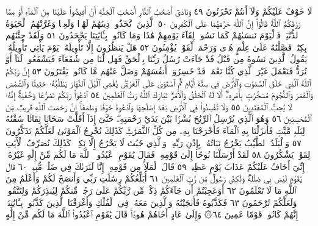 لَا خَوْفٌ عَلَيْكُمْ وَلَآ أَنتُمْ تَحْزَنُونَ ٤٩ وَنَادَىٰٓ أَصْحَٰبُ ٱلنَّارِ أَصْحَٰبَ
ٱلْجَنَّةِ أَنْ أَفِيضُوا۟ عَلَيْنَا مِنَ ٱلْمَآءِ أَوْ مِمَّا رَزَقَكُمُ ٱللَّهُۚ قَالُوٓا۟
إِنَّ ٱللَّهَ حَرَّمَهُمَا عَلَى ٱلْكَٰفِرِينَ ٥٠ ٱلَّذِينَ ٱتَّخَذُوا۟ دِينَهُمْ لَهْوࣰا
وَلَعِبࣰا وَغَرَّتْهُمُ ٱلْحَيَوٰةُ ٱلدُّنْيَاۚ فَٱلْيَوْمَ نَنسَىٰهُمْ كَمَا نَسُوا۟
لِقَآءَ يَوْمِهِمْ هَٰذَا وَمَا كَانُوا۟ بِـَٔايَٰتِنَا يَجْحَدُونَ ٥١
وَلَقَدْ جِئْنَٰهُم بِكِتَٰبࣲ فَصَّلْنَٰهُ عَلَىٰ عِلْمٍ هُدࣰى وَرَحْمَةࣰ
لِّقَوْمࣲ يُؤْمِنُونَ ٥٢ هَلْ يَنظُرُونَ إِلَّا تَأْوِيلَهُۥۚ يَوْمَ يَأْتِي تَأْوِيلُهُۥ
يَقُولُ ٱلَّذِينَ نَسُوهُ مِن قَبْلُ قَدْ جَآءَتْ رُسُلُ رَبِّنَا بِٱلْحَقِّ
فَهَل لَّنَا مِن شُفَعَآءَ فَيَشْفَعُوا۟ لَنَآ أَوْ نُرَدُّ فَنَعْمَلَ غَيْرَ ٱلَّذِي
كُنَّا نَعْمَلُۚ قَدْ خَسِرُوٓا۟ أَنفُسَهُمْ وَضَلَّ عَنْهُم مَّا كَانُوا۟
يَفْتَرُونَ ٥٣ إِنَّ رَبَّكُمُ ٱللَّهُ ٱلَّذِي خَلَقَ ٱلسَّمَٰوَٰتِ وَٱلْأَرْضَ
فِي سِتَّةِ أَيَّامࣲ ثُمَّ ٱسْتَوَىٰ عَلَى ٱلْعَرْشِۖ يُغْشِي ٱلَّيْلَ ٱلنَّهَارَ
يَطْلُبُهُۥ حَثِيثࣰا وَٱلشَّمْسَ وَٱلْقَمَرَ وَٱلنُّجُومَ مُسَخَّرَٰتِۭ
بِأَمْرِهِۦٓۗ أَلَا لَهُ ٱلْخَلْقُ وَٱلْأَمْرُۗ تَبَارَكَ ٱللَّهُ رَبُّ ٱلْعَٰلَمِينَ ٥٤
ٱدْعُوا۟ رَبَّكُمْ تَضَرُّعࣰا وَخُفْيَةًۚ إِنَّهُۥ لَا يُحِبُّ ٱلْمُعْتَدِينَ ٥٥
وَلَا تُفْسِدُوا۟ فِي ٱلْأَرْضِ بَعْدَ إِصْلَٰحِهَا وَٱدْعُوهُ خَوْفࣰا وَطَمَعًاۚ
إِنَّ رَحْمَتَ ٱللَّهِ قَرِيبࣱ مِّنَ ٱلْمُحْسِنِينَ ٥٦ وَهُوَ ٱلَّذِي يُرْسِلُ
ٱلرِّيَٰحَ بُشْرَۢا بَيْنَ يَدَيْ رَحْمَتِهِۦۖ حَتَّىٰٓ إِذَآ أَقَلَّتْ سَحَابࣰا ثِقَالࣰا
سُقْنَٰهُ لِبَلَدࣲ مَّيِّتࣲ فَأَنزَلْنَا بِهِ ٱلْمَآءَ فَأَخْرَجْنَا بِهِۦ مِن كُلِّ
ٱلثَّمَرَٰتِۚ كَذَٰلِكَ نُخْرِجُ ٱلْمَوْتَىٰ لَعَلَّكُمْ تَذَكَّرُونَ ٥٧
وَٱلْبَلَدُ ٱلطَّيِّبُ يَخْرُجُ نَبَاتُهُۥ بِإِذْنِ رَبِّهِۦۖ وَٱلَّذِي خَبُثَ لَا يَخْرُجُ
إِلَّا نَكِدࣰاۚ كَذَٰلِكَ نُصَرِّفُ ٱلْأٓيَٰتِ لِقَوْمࣲ يَشْكُرُونَ ٥٨
لَقَدْ أَرْسَلْنَا نُوحًا إِلَىٰ قَوْمِهِۦ فَقَالَ يَٰقَوْمِ ٱعْبُدُوا۟ ٱللَّهَ مَا لَكُم
مِّنْ إِلَٰهٍ غَيْرُهُۥٓ إِنِّيٓ أَخَافُ عَلَيْكُمْ عَذَابَ يَوْمٍ عَظِيمࣲ ٥٩
قَالَ ٱلْمَلَأُ مِن قَوْمِهِۦٓ إِنَّا لَنَرَىٰكَ فِي ضَلَٰلࣲ مُّبِينࣲ ٦٠ قَالَ يَٰقَوْمِ
لَيْسَ بِي ضَلَٰلَةࣱ وَلَٰكِنِّي رَسُولࣱ مِّن رَّبِّ ٱلْعَٰلَمِينَ ٦١
أُبَلِّغُكُمْ رِسَٰلَٰتِ رَبِّي وَأَنصَحُ لَكُمْ وَأَعْلَمُ مِنَ ٱللَّهِ
مَا لَا تَعْلَمُونَ ٦٢ أَوَعَجِبْتُمْ أَن جَآءَكُمْ ذِكْرࣱ مِّن رَّبِّكُمْ
عَلَىٰ رَجُلࣲ مِّنكُمْ لِيُنذِرَكُمْ وَلِتَتَّقُوا۟ وَلَعَلَّكُمْ تُرْحَمُونَ ٦٣
فَكَذَّبُوهُ فَأَنجَيْنَٰهُ وَٱلَّذِينَ مَعَهُۥ فِي ٱلْفُلْكِ وَأَغْرَقْنَا ٱلَّذِينَ
كَذَّبُوا۟ بِـَٔايَٰتِنَآۚ إِنَّهُمْ كَانُوا۟ قَوْمًا عَمِينَ ٦٤۞ وَإِلَىٰ
عَادٍ أَخَاهُمْ هُودࣰاۚ قَالَ يَٰقَوْمِ ٱعْبُدُوا۟ ٱللَّهَ مَا لَكُم مِّنْ إِلَٰهٍ
